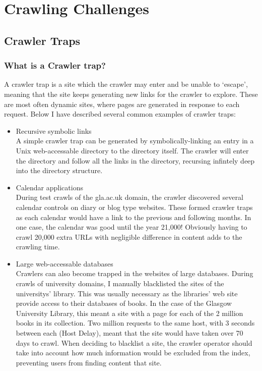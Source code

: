 \chapter{Crawling Challenges}\label{chp-challenges}
\section{Crawler Traps}
\subsection{What is a Crawler trap?}
A crawler trap is a site which the crawler may enter and be unable to `escape', meaning that the site keeps generating new links for the crawler to explore. These are most often dynamic sites, where pages are generated in response to each request. Below I have described several common examples of crawler traps:
\begin{itemize}
\item{Recursive symbolic links\\}
A simple crawler trap can be generated by symbolically-linking an entry in a Unix web-accessable directory to the directory itself. The crawler will enter the directory and follow all the links in the directory, recursing infintely deep into the directory structure.
\item{Calendar applications\\}
During test crawls of the gla.ac.uk domain, the crawler discovered several calendar controls on diary or blog type websites. These formed crawler traps as each calendar would have a link to the previous and following months. In one case, the calendar was good until the year 21,000! Obviously having to crawl 20,000 extra URLs with negligible difference in content adds to the crawling time.
\item{Large web-accessable databases\\}
Crawlers can also become trapped in the websites of large databases. During crawls of university domains, I manually blacklisted the sites of the universitys' library. This was usually necessary as the libraries' web site provide access to their databases of books. In the case of the Glasgow University Library, this meant a site with a page for each of the 2 million books in its collection. Two million requests to the same host, with 3 seconds between each (Host Delay), meant that the site would have taken over 70 days to crawl. When deciding to blacklist a site, the crawler operator should take into account how much information would be excluded from the index, preventing users from finding content that site.
\end{itemize}

